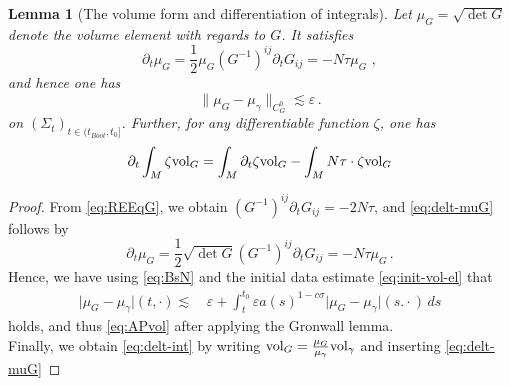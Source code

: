\documentclass[11pt,leqno,textwidth=10cm]{amsart}
\numberwithin{equation}{section}
\theoremstyle{definition}
\theoremstyle{plain}
\newtheorem{lemma}[definition]{Lemma}
\newcommand{\1}{\mathbbm{1}}
\newcommand{\vol}[1]{{\text{\normalfont{vol}}}_{#1}}
\renewcommand{\epsilon}{\varepsilon}
\newcommand{\del}{\partial}
\begin{document}
\begin{lemma}[The volume form and differentiation of integrals]\label{lem:delt-int}
Let $\mu_G=\sqrt{\det G}$ denote the volume element with regards to $G$. It satisfies
\begin{equation}\label{eq:delt-muG}
\del_t\mu_G=\frac12\mu_G(G^{-1})^{ij}\del_tG_{ij}=-N\tau\mu_G\,\,,
\end{equation}
and hence one has
\begin{equation}\label{eq:APvol}
\|\mu_{G}-\mu_{\gamma}\|_{C^0_G}\lesssim\epsilon \,.
\end{equation}
on $(\Sigma_t)_{t\in(t_{Boot},t_0]}$. Further, for any differentiable function $\zeta$, one has
\begin{equation}\label{eq:delt-int}
\del_t\int_M \zeta\vol{G} = \int_M \del_t\zeta\vol{G}-\int_MN\tau \cdot \zeta\vol{G}
\end{equation}
\end{lemma}
\begin{proof}
From \eqref{eq:REEqG}, we obtain $(G^{-1})^{ij}\del_tG_{ij}=-2N\tau$,
and \eqref{eq:delt-muG} follows by
\[\del_t\mu_G%
=\frac12\sqrt{\det G}(G^{-1})^{ij}\del_tG_{ij}=-N\tau\mu_G\,.\]
Hence, we have using \eqref{eq:BsN} and the initial data estimate \eqref{eq:init-vol-el} that
\begin{align*}
\lvert\mu_G-\mu_\gamma\rvert(t,\cdot)%
\lesssim&\, \epsilon+\int_t^{t_0}\epsilon a(s)^{1-c\sigma}\lvert\mu_G-\mu_\gamma\rvert(s.\cdot)\,ds
\end{align*}
holds, and thus \eqref{eq:APvol} after applying the Gronwall lemma.\\
Finally, we obtain \eqref{eq:delt-int} by writing $\vol{G}=\frac{\mu_G}{\mu_\gamma}\vol{\gamma}$ and inserting \eqref{eq:delt-muG}
\end{proof}
\end{document}
